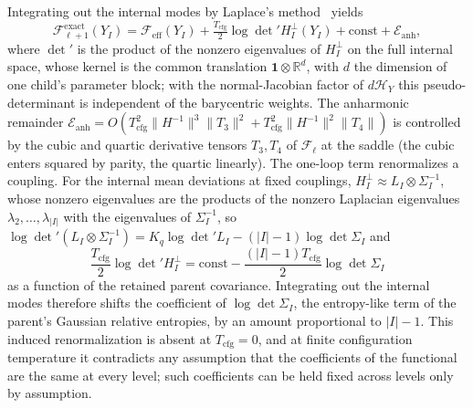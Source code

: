 \documentclass[11pt]{article}
\begin{document}
Integrating out the internal modes by Laplace's method~\cite{wong2001asymptotic} yields
\begin{equation}
\mathcal{F}^{\mathrm{exact}}_{\ell+1}(Y_I) = \mathcal{F}_{\mathrm{eff}}(Y_I) + \tfrac{T_{\mathrm{cfg}}}{2}\log\det{}'H_I^\perp(Y_I) + \mathrm{const} + \mathcal{E}_{\mathrm{anh}},
\label{eq:rg_laplace}
\end{equation}
where $\det{}'$ is the product of the nonzero eigenvalues of $H_I^\perp$ on the full internal space, whose kernel is the common translation $\mathbf{1}\otimes\mathbb{R}^{d}$, with $d$ the dimension of one child's parameter block; with the normal-Jacobian factor of $d\mathcal{H}_Y$ this pseudo-determinant is independent of the barycentric weights. The anharmonic remainder $\mathcal{E}_{\mathrm{anh}} = O(T_{\mathrm{cfg}}^2 \|H^{-1}\|^3 \|T_3\|^2 + T_{\mathrm{cfg}}^2 \|H^{-1}\|^2 \|T_4\|)$ is controlled by the cubic and quartic derivative tensors $T_3, T_4$ of $\mathcal{F}_\ell$ at the saddle (the cubic enters squared by parity, the quartic linearly). The one-loop term renormalizes a coupling. For the internal mean deviations at fixed couplings, $H_I^\perp\approx L_I\otimes\Sigma_I^{-1}$, whose nonzero eigenvalues are the products of the nonzero Laplacian eigenvalues $\lambda_2,\ldots,\lambda_{|I|}$ with the eigenvalues of $\Sigma_I^{-1}$, so $\log\det{}'(L_I\otimes\Sigma_I^{-1})=K_q\log\det{}'L_I-(|I|-1)\log\det\Sigma_I$ and
\begin{equation}
\frac{T_{\mathrm{cfg}}}{2}\log\det{}'H_I^\perp=\mathrm{const}-\frac{(|I|-1)T_{\mathrm{cfg}}}{2}\log\det\Sigma_I
\label{eq:rg_entropy_shift}
\end{equation}
as a function of the retained parent covariance. Integrating out the internal modes therefore shifts the coefficient of $\log\det\Sigma_I$, the entropy-like term of the parent's Gaussian relative entropies, by an amount proportional to $|I|-1$. This induced renormalization is absent at $T_{\mathrm{cfg}}=0$, and at finite configuration temperature it contradicts any assumption that the coefficients of the functional are the same at every level; such coefficients can be held fixed across levels only by assumption.
\end{document}
